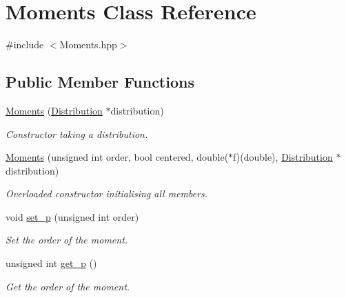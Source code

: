 \hypertarget{classMoments}{}\section{Moments Class Reference}
\label{classMoments}


{\ttfamily \#include $<$Moments.\+hpp$>$}

\subsection*{Public Member Functions}
\begin{DoxyCompactItemize}
\item 
\mbox{\label{classMoments_ab137d6fede152f8f6aeaf9178d6a7142}} 
\hyperlink{classMoments_ab137d6fede152f8f6aeaf9178d6a7142}{Moments} (\hyperlink{classDistribution}{Distribution} $\ast$distribution)
\begin{DoxyCompactList}\small\item\em Constructor taking a distribution. \end{DoxyCompactList}\item 
\mbox{\label{classMoments_a6830cc3cbed506217e9e98eb3cd194b0}} 
\hyperlink{classMoments_a6830cc3cbed506217e9e98eb3cd194b0}{Moments} (unsigned int order, bool centered, double($\ast$f)(double), \hyperlink{classDistribution}{Distribution} $\ast$distribution)
\begin{DoxyCompactList}\small\item\em Overloaded constructor initialising all members. \end{DoxyCompactList}\item 
\mbox{\label{classMoments_a18abc070029c3f4c986bddcafbd3345b}} 
void \hyperlink{classMoments_a18abc070029c3f4c986bddcafbd3345b}{set\+\_\+p} (unsigned int order)
\begin{DoxyCompactList}\small\item\em Set the order of the moment. \end{DoxyCompactList}\item 
\mbox{\label{classMoments_adba1c979477f015fa887a9123dbf5cee}} 
unsigned int \hyperlink{classMoments_adba1c979477f015fa887a9123dbf5cee}{get\+\_\+p} ()
\begin{DoxyCompactList}\small\item\em Get the order of the moment. \end{DoxyCompactList}\item 

\end{DoxyCompactItemize}
